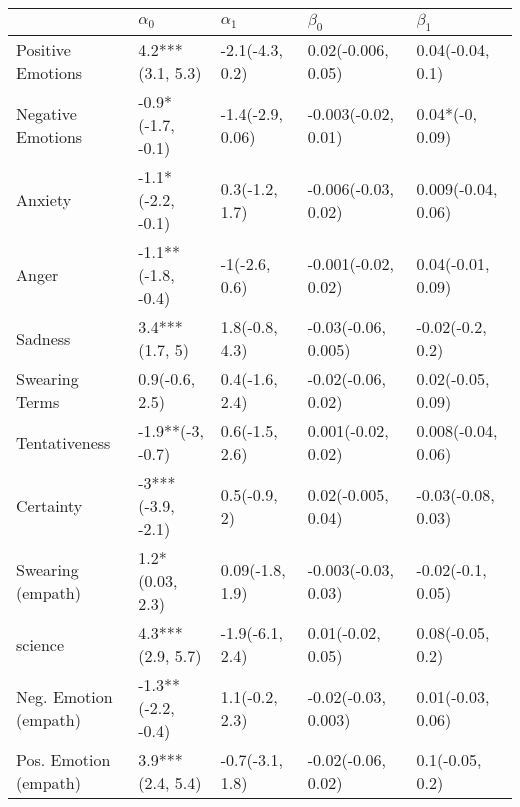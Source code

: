 \begin{tabular}{lllll}
\toprule
{} &          $\alpha_0$ &        $\alpha_1$ &            $\beta_0$ &           $\beta_1$ \\
\midrule
Positive Emotions     &    4.2***(3.1, 5.3) &   -2.1(-4.3, 0.2) &   0.02(-0.006, 0.05) &    0.04(-0.04, 0.1) \\
Negative Emotions     &   -0.9*(-1.7, -0.1) &  -1.4(-2.9, 0.06) &  -0.003(-0.02, 0.01) &     0.04*(-0, 0.09) \\
Anxiety               &   -1.1*(-2.2, -0.1) &    0.3(-1.2, 1.7) &  -0.006(-0.03, 0.02) &  0.009(-0.04, 0.06) \\
Anger                 &  -1.1**(-1.8, -0.4) &     -1(-2.6, 0.6) &  -0.001(-0.02, 0.02) &   0.04(-0.01, 0.09) \\
Sadness               &      3.4***(1.7, 5) &    1.8(-0.8, 4.3) &  -0.03(-0.06, 0.005) &    -0.02(-0.2, 0.2) \\
Swearing Terms        &      0.9(-0.6, 2.5) &    0.4(-1.6, 2.4) &   -0.02(-0.06, 0.02) &   0.02(-0.05, 0.09) \\
Tentativeness         &    -1.9**(-3, -0.7) &    0.6(-1.5, 2.6) &   0.001(-0.02, 0.02) &  0.008(-0.04, 0.06) \\
Certainty             &   -3***(-3.9, -2.1) &      0.5(-0.9, 2) &   0.02(-0.005, 0.04) &  -0.03(-0.08, 0.03) \\
Swearing (empath)     &     1.2*(0.03, 2.3) &   0.09(-1.8, 1.9) &  -0.003(-0.03, 0.03) &   -0.02(-0.1, 0.05) \\
science               &    4.3***(2.9, 5.7) &   -1.9(-6.1, 2.4) &    0.01(-0.02, 0.05) &    0.08(-0.05, 0.2) \\
Neg. Emotion (empath) &  -1.3**(-2.2, -0.4) &    1.1(-0.2, 2.3) &  -0.02(-0.03, 0.003) &   0.01(-0.03, 0.06) \\
Pos. Emotion (empath) &    3.9***(2.4, 5.4) &   -0.7(-3.1, 1.8) &   -0.02(-0.06, 0.02) &     0.1(-0.05, 0.2) \\
\bottomrule
\end{tabular}
